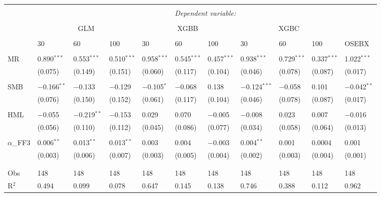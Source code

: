 \begin{table}[H] 
\centering 
\footnotesize
\begin{tabularx}{\textwidth}{XXXX|XXX|XXX|l} 
\\[-2ex]\hline 
\hline \\[-2ex] 
 & \multicolumn{10}{c}{\textit{Dependent variable:}} \\ 
\cline{2-11} 
\\[-2ex] 
 & \multicolumn{3}{c}{GLM} & \multicolumn{3}{c}{XGBB} & \multicolumn{3}{c}{XGBC} & \\
 \cline{2-10}
 \\[-2ex] 
 & 30 & 60 & 100 & 30 & 60 & 100 & 30 & 60 & 100 & OSEBX \\ 
 \cline{2-10} \\
 MR & 0.890$^{***}$ & 0.553$^{***}$ & 0.510$^{***}$ & 0.958$^{***}$ & 0.545$^{***}$ & 0.457$^{***}$ & 0.938$^{***}$ & 0.729$^{***}$ & 0.337$^{***}$ & 1.022$^{***}$ \\ 
  & (0.075) & (0.149) & (0.151) & (0.060) & (0.117) & (0.104) & (0.046) & (0.078) & (0.087) & (0.017) \\
   & & & & & & & & & & \\ 
 SMB & $-$0.166$^{**}$ & $-$0.133 & $-$0.129 & $-$0.105$^{*}$ & $-$0.068 & 0.138 & $-$0.124$^{***}$ & $-$0.058 & 0.101 & $-$0.042$^{**}$ \\ 
  & (0.076) & (0.150) & (0.152) & (0.061) & (0.117) & (0.104) & (0.046) & (0.078) & (0.087) & (0.017) \\ 
   & & & & & & & & & & \\ 
 HML & $-$0.055 & $-$0.219$^{**}$ & $-$0.153 & 0.029 & 0.070 & $-$0.005 & $-$0.008 & 0.023 & 0.007 & $-$0.016 \\ 
  & (0.056) & (0.110) & (0.112) & (0.045) & (0.086) & (0.077) & (0.034) & (0.058) & (0.064) & (0.013) \\ 
   & & & & & & & & & & \\ 
 $\alpha$_{FF3} & 0.006$^{**}$ & 0.013$^{**}$ & 0.013$^{**}$ & 0.003 & 0.004 & $-$0.003 & 0.004$^{**}$ & 0.001 & 0.0004 & 0.001 \\ 
  & (0.003) & (0.006) & (0.007) & (0.003) & (0.005) & (0.004) & (0.002) & (0.003) & (0.004) & (0.001) \\ 
   & & & & & & & & & & \\   
\hline \\[-3ex] 
Obs & 148 & 148 & 148 & 148 & 148 & 148 & 148 & 148 & 148 & 148 \\ 
R$^{2}$ & 0.494 & 0.099 & 0.078 & 0.647 & 0.145 & 0.138 & 0.746 & 0.388 & 0.112 & 0.962 \\ 

\end{tabularx}
\end{table}
